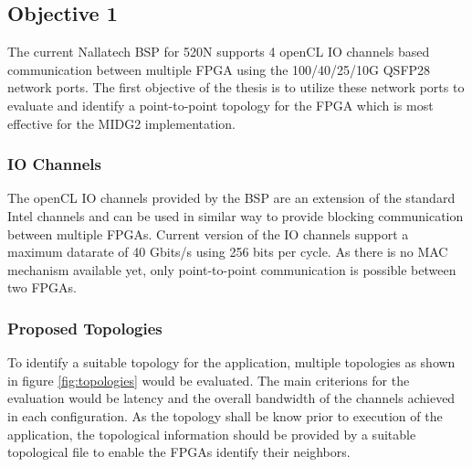\documentclass[english,notitlepage]{hgbreport}
\begin{document}
\subsection{Objective 1}

The current Nallatech BSP for 520N supports 4 openCL IO channels based communication between
multiple FPGA using the 100/40/25/10G QSFP28 network ports. The first objective of
the thesis is to utilize these network ports to evaluate and identify a point-to-point
topology for the FPGA which is most effective for the MIDG2 implementation.

\subsubsection{IO Channels}

The openCL IO channels provided by the BSP are an extension of the standard Intel channels \cite{noauthor_intel_2018}
and can be used in similar way to provide blocking communication between multiple FPGAs.
Current version of the IO channels support a maximum datarate of 40 Gbits/s using 256 bits per cycle.
As there is no MAC mechanism available yet, only point-to-point communication is possible between
two FPGAs.

\subsubsection{Proposed Topologies}

To identify a suitable topology for the application, multiple topologies
as shown in figure \ref{fig:topologies} would be evaluated. The main criterions for the evaluation
would be latency and the overall bandwidth of the channels achieved in each
configuration. As the topology shall be know prior to execution of the application,
the topological information should be provided by a suitable topological file
to enable the FPGAs identify their neighbors.
\end{document}
